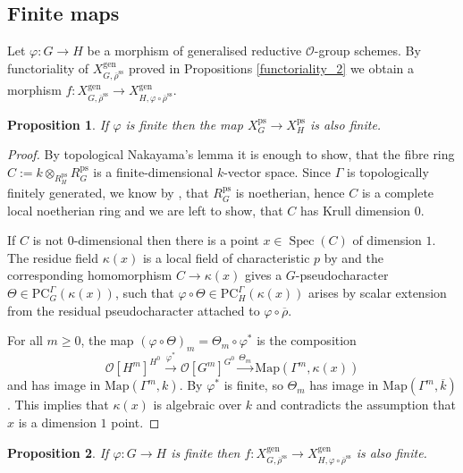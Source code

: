 \documentclass{amsart}
\newtheorem{prop}{Proposition}[section]
\theoremstyle{definition}
\theoremstyle{remark}
\DeclareMathOperator{\Spec}{Spec}
\newcommand{\OO}{\mathcal O}
\newcommand{\rhobar}{\overline{\rho}}
\newcommand{\ps}{\mathrm{ps}}
\newcommand{\gen}{\mathrm{gen}}
\newcommand{\rhobarss}{\rhobar^{\mathrm{ss}}}
\newcommand{\PC}{\mathrm{PC}}
\newcommand{\Map}{\mathrm{Map}}
\begin{document}
\subsection{Finite maps}\label{sec_finite} Let $\varphi: G\rightarrow H$ be a morphism of generalised reductive $\OO$-group schemes. 
By functoriality of $X^{\gen}_{G,\rhobarss}$ proved in Propositions \ref{functoriality_2} we obtain a 
morphism $f: X^{\gen}_{G, \rhobarss}\rightarrow X^{\gen}_{H, \varphi\circ \rhobarss}$. 

\begin{prop}\label{finite_functoriality} If $\varphi$ is finite then the map $X^{\ps}_{G}\rightarrow X^{\ps}_H$ is also finite. 
\end{prop}

\begin{proof}
    By topological Nakayama's lemma it is enough to show, that the fibre ring $C := k \otimes_{R^{\ps}_{H}} R^{\ps}_{G}$ is a finite-dimensional $k$-vector space.
    Since $\Gamma$ is topologically finitely generated, we know by \cite[Theorem 5.7]{quast}, that $R^{\ps}_{G}$ is noetherian, hence $C$ is a complete local noetherian ring and we are left to show, that $C$ has Krull dimension $0$.
    
    If $C$ is not $0$-dimensional then there is a point $x \in \Spec(C)$ of dimension $1$.
    The residue field $\kappa(x)$ is a local field of characteristic $p$ by \cite[Lemma 3.17]{BIP_new} and the corresponding homomorphism $C \to \kappa(x)$ gives a $G$-pseudocharacter $\Theta \in \PC_{G}^{\Gamma}(\kappa(x))$, such that $\varphi \circ \Theta \in \PC_{H}^{\Gamma}(\kappa(x))$ arises by scalar extension from the residual pseudocharacter attached to $\varphi \circ \rhobar$.

    For all $m \geq 0$, the map $(\varphi \circ \Theta)_m = \Theta_m \circ \varphi^*$ is the composition
    $$ \OO[H^m]^{H^0} \xrightarrow{\varphi^*} \OO[G^m]^{G^0} \xrightarrow{\Theta_m} \Map(\Gamma^m, \kappa(x)) $$
    and has image in $\Map(\Gamma^m, k)$.
    By  $\varphi^*$ is finite, so $\Theta_m$ has image in $\Map(\Gamma^m, \overline{k})$.
    This implies that $\kappa(x)$ is algebraic over $k$ and contradicts the assumption that $x$ is a dimension $1$ point.
\end{proof}

\begin{prop}\label{finite_maps} If $\varphi: G \rightarrow H $ is finite then  $f:X^{\gen}_{G, \rhobarss}\rightarrow X^{\gen}_{H, \varphi\circ \rhobarss}$  is also finite. 
\end{prop}
\end{document}
